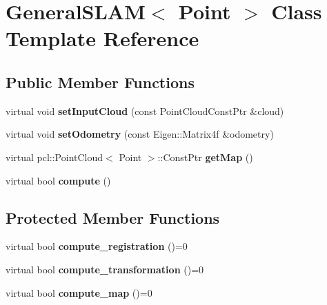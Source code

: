 \hypertarget{classGeneralSLAM_3_01Point_01_4}{
\section{GeneralSLAM$<$ Point $>$ Class Template Reference}
\label{classGeneralSLAM_3_01Point_01_4}
}
\subsection*{Public Member Functions}
\begin{DoxyCompactItemize}
\item 
\hypertarget{classGeneralSLAM_3_01Point_01_4_ad5e6253055dbce078237df09ca214f7f}{
virtual void {\bfseries setInputCloud} (const PointCloudConstPtr \&cloud)}
\label{classGeneralSLAM_3_01Point_01_4_ad5e6253055dbce078237df09ca214f7f}

\item 
\hypertarget{classGeneralSLAM_3_01Point_01_4_a933a894a635bec386c52d419c6fe6eaf}{
virtual void {\bfseries setOdometry} (const Eigen::Matrix4f \&odometry)}
\label{classGeneralSLAM_3_01Point_01_4_a933a894a635bec386c52d419c6fe6eaf}

\item 
\hypertarget{classGeneralSLAM_3_01Point_01_4_a4e88110d75d7ef1e4f66b10e3c746e4b}{
virtual pcl::PointCloud$<$ Point $>$::ConstPtr {\bfseries getMap} ()}
\label{classGeneralSLAM_3_01Point_01_4_a4e88110d75d7ef1e4f66b10e3c746e4b}

\item 
\hypertarget{classGeneralSLAM_3_01Point_01_4_a388cf32bdea9d6ef0f65a2cbe1ff50ed}{
virtual bool {\bfseries compute} ()}
\label{classGeneralSLAM_3_01Point_01_4_a388cf32bdea9d6ef0f65a2cbe1ff50ed}

\end{DoxyCompactItemize}
\subsection*{Protected Member Functions}
\begin{DoxyCompactItemize}
\item 
\hypertarget{classGeneralSLAM_3_01Point_01_4_abe93ad9710699113fb3e592c4d99b3bc}{
virtual bool {\bfseries compute\_\-registration} ()=0}
\label{classGeneralSLAM_3_01Point_01_4_abe93ad9710699113fb3e592c4d99b3bc}

\item 
\hypertarget{classGeneralSLAM_3_01Point_01_4_a17daec21ee9f79c09b045f3d8bf61c5b}{
virtual bool {\bfseries compute\_\-transformation} ()=0}
\label{classGeneralSLAM_3_01Point_01_4_a17daec21ee9f79c09b045f3d8bf61c5b}

\item 
\hypertarget{classGeneralSLAM_3_01Point_01_4_a0025a4dc5d69ae918fb55a0c6a74b4f6}{
virtual bool {\bfseries compute\_\-map} ()=0}
\label{classGeneralSLAM_3_01Point_01_4_a0025a4dc5d69ae918fb55a0c6a74b4f6}

\end{DoxyCompactItemize}
